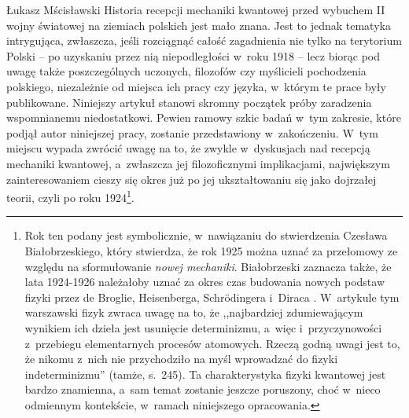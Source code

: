 \begin{artplenv}{Łukasz Mścisławski}
\lettrine[loversize=0.13,lines=2,lraise=-0.01,nindent=0em,findent=0.2pt]%
{H}{}istoria recepcji mechaniki kwantowej przed wybuchem II wojny światowej na ziemiach polskich jest mało znana. Jest to jednak tematyka intrygująca, zwłaszcza, jeśli rozciągnąć całość zagadnienia nie tylko na terytorium Polski -- po uzyskaniu przez nią niepodległości w~roku 1918 -- lecz biorąc pod uwagę także poszczególnych uczonych, filozofów czy myślicieli pochodzenia polskiego, niezależnie od miejsca ich pracy czy języka, w~którym te prace były publikowane. Niniejszy artykuł stanowi skromny początek próby zaradzenia wspomnianemu niedostatkowi. Pewien ramowy szkic badań w~tym zakresie, które podjął autor niniejszej pracy, zostanie przedstawiony w~zakończeniu. W~tym miejscu wypada zwrócić uwagę na to, że zwykle w~dyskusjach nad recepcją mechaniki kwantowej, a~zwłaszcza jej filozoficznymi implikacjami, największym zainteresowaniem cieszy się okres już po jej ukształtowaniu się jako dojrzałej teorii, czyli po roku 1924\footnote{Rok ten podany jest symbolicznie, w~nawiązaniu do stwierdzenia Czesława Białobrzeskiego, który stwierdza, że rok 1925 można uznać za przełomowy ze względu na sformułowanie \textit{nowej mechaniki}. Białobrzeski zaznacza także, że lata 1924-1926 należałoby uznać za okres czas budowania nowych podstaw fizyki przez de Broglie, Heisenberga, Schrödingera i~Diraca
\parencite[por.][s.~244–245]{bialobrzeski_ogolnonaukowe_1937}. %
 W~artykule tym warszawski fizyk zwraca uwagę na to, że ,,najbardziej zdumiewającym wynikiem ich dzieła jest usunięcie determinizmu, a~więc i~przyczynowości z~przebiegu elementarnych procesów atomowych. Rzeczą godną uwagi jest to, że nikomu z~nich nie przychodziło na myśl wprowadzać do fizyki indeterminizmu'' (tamże, s.~245). Ta charakterystyka fizyki kwantowej jest bardzo znamienna, a~sam temat zostanie jeszcze poruszony, choć w~nieco odmiennym kontekście, w~ramach niniejszego opracowania.}.


\end{artplenv}

